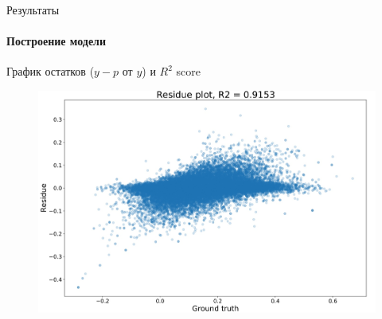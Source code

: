 \documentclass{beamer}
\begin{document}
\begin{frame}{Результаты}
\framesubtitle{Построение модели}
График остатков ($y - p$ от $y$) и $R^2$ score
\begin{figure}[h!]
    \centering
    \includegraphics[scale=0.18]{residue_plot.jpg}
\end{figure}
\end{frame}


\end{document}
